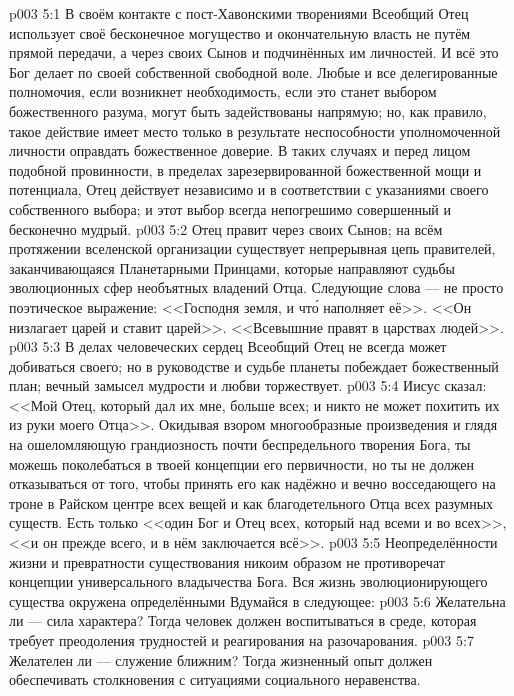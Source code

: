 \vs p003 5:1 В своём контакте с пост\hyp{}Хавонскими творениями Всеобщий Отец использует своё бесконечное могущество и окончательную власть не путём прямой передачи, а через своих Сынов и подчинённых им личностей. И всё это Бог делает по своей собственной свободной воле. Любые и все делегированные полномочия, если возникнет необходимость, если это станет выбором божественного разума, могут быть задействованы напрямую; но, как правило, такое действие имеет место только в результате неспособности уполномоченной личности оправдать божественное доверие. В таких случаях и перед лицом подобной провинности, в пределах зарезервированной божественной мощи и потенциала, Отец действует независимо и в соответствии с указаниями своего собственного выбора; и этот выбор всегда непогрешимо совершенный и бесконечно мудрый.
\vs p003 5:2 Отец правит через своих Сынов; на всём протяжении вселенской организации существует непрерывная цепь правителей, заканчивающаяся Планетарными Принцами, которые направляют судьбы эволюционных сфер необъятных владений Отца. Следующие слова --- не просто поэтическое выражение: <<Господня земля, и чт\'о наполняет её>>. <<Он низлагает царей и ставит царей>>. <<Всевышние правят в царствах людей>>.
\vs p003 5:3 В делах человеческих сердец Всеобщий Отец не всегда может добиваться своего; но в руководстве и судьбе планеты побеждает божественный план; вечный замысел мудрости и любви торжествует.
\vs p003 5:4 Иисус сказал: <<Мой Отец, который дал их мне, больше всех; и никто не может похитить их из руки моего Отца>>. Окидывая взором многообразные произведения и глядя на ошеломляющую грандиозность почти беспредельного творения Бога, ты можешь поколебаться в твоей концепции его первичности, но ты не должен отказываться от того, чтобы принять его как надёжно и вечно восседающего на троне в Райском центре всех вещей и как благодетельного Отца всех разумных существ. Есть только <<один Бог и Отец всех, который над всеми и во всех>>, <<и он прежде всего, и в нём заключается всё>>.
\vs p003 5:5 \pc Неопределённости жизни и превратности существования никоим образом не противоречат концепции универсального владычества Бога. Вся жизнь эволюционирующего существа окружена определёнными  Вдумайся в следующее:
\vs p003 5:6 \bibnobreakspace Желательна ли  --- сила характера? Тогда человек должен воспитываться в среде, которая требует преодоления трудностей и реагирования на разочарования.
\vs p003 5:7 \bibnobreakspace Желателен ли  --- служение ближним? Тогда жизненный опыт должен обеспечивать столкновения с ситуациями социального неравенства.
